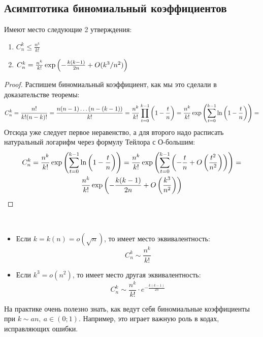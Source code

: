 \subsection{Асимптотика биномиальный коэффициентов}

\begin{lemma}
	Имеют место следующие 2 утверждения:
	\begin{enumerate}
		\item \(C_n^k \le \frac{n^k}{k!}\)
		
		\item \(C_n^k = \frac{n^k}{k!} \exp \left(-\frac{k(k - 1)}{2n} + O(k^3 / n^2)\right)\)
	\end{enumerate}
\end{lemma}

\begin{proof}
	Распишем биномиальный коэффициент, как мы это сделали в доказательстве теоремы:
	\begin{multline*}
		C_n^k = \frac{n!}{k! (n - k)!} = \frac{n(n - 1) \ldots (n - (k - 1))}{k!} = \frac{n^k}{k!} \prod_{t = 0}^{k - 1} \left(1 - \frac{t}{n}\right) = \frac{n^k}{k!} \exp\left(\sum_{t = 0}^{k - 1} \ln\left(1 - \frac{t}{n}\right)\right) =
	\end{multline*}
	Отсюда уже следует первое неравенство, а для второго надо расписать натуральный логарифм через формулу Тейлора с О-большим:
	\begin{multline*}
		C_n^k = \frac{n^k}{k!} \exp\left(\sum_{t = 0}^{k - 1} \ln\left(1 - \frac{t}{n}\right)\right) = \frac{n^k}{k!} \exp\left(\sum_{t = 0}^{k - 1} \left(-\frac{t}{n} + O\left(\frac{t^2}{n^2}\right)\right)\right) =
		\\
		\frac{n^k}{k!} \exp\left(-\frac{k(k - 1)}{2n} + O\left(\frac{k^3}{n^2}\right)\right)
	\end{multline*}
\end{proof}

\begin{corollary}~
	\begin{itemize}
		\item Если $k = k(n) = o(\sqrt{n})$, то имеет место эквивалентность:
		\[
			C_n^k \sim \frac{n^k}{k!}
		\]
		
		\item Если $k^3 = o(n^2)$, то имеет место другая эквивалентность:
		\[
			C_n^k \sim \frac{n^k}{k!} \cdot e^{-\frac{k(k - 1)}{2n}}
		\]
	\end{itemize}
\end{corollary}

\begin{note}
	На практике очень полезно знать, как ведут себя биномиальные коэффициенты при $k \sim an,\ a \in (0; 1)$. Например, это играет важную роль в кодах, исправляющих ошибки.
\end{note}

